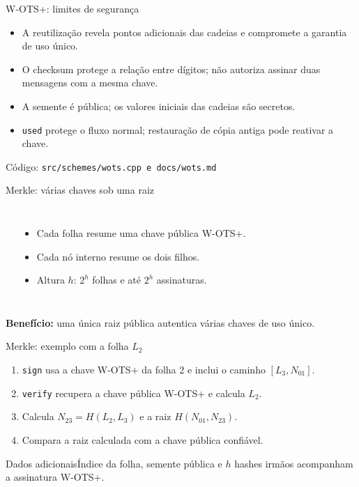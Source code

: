 \documentclass[aspectratio=169,11pt]{beamer}
\newcommand{\code}[1]{\texttt{#1}}
\newcommand{\src}[1]{\vfill{\scriptsize\color{muted} Código: \texttt{#1}}}
\begin{document}
\begin{frame}{W-OTS+: limites de segurança}
\begin{itemize}
\item A reutilização revela pontos adicionais das cadeias e compromete a garantia de uso único.
\item O checksum protege a relação entre dígitos; não autoriza assinar duas mensagens com a mesma chave.
\item A semente é pública; os valores iniciais das cadeias são secretos.
\item \code{used} protege o fluxo normal; restauração de cópia antiga pode reativar a chave.
\end{itemize}
\src{src/schemes/wots.cpp \quad e \quad docs/wots.md}
\end{frame}

\begin{frame}{Merkle: várias chaves sob uma raiz}
\begin{columns}[T,onlytextwidth]
\begin{center}\end{center}
\begin{itemize}
\item Cada folha resume uma chave pública W-OTS+.
\item Cada nó interno resume os dois filhos.
\item Altura $h$: $2^h$ folhas e até $2^h$ assinaturas.
\end{itemize}
\end{columns}
\vspace{0.25cm}\textbf{Benefício:} uma única raiz pública autentica várias chaves de uso único.
\end{frame}

\begin{frame}{Merkle: exemplo com a folha $L_2$}
\begin{enumerate}
\item \code{sign} usa a chave W-OTS+ da folha 2 e inclui o caminho $[L_3,N_{01}]$.
\item \code{verify} recupera a chave pública W-OTS+ e calcula $L_2$.
\item Calcula $N_{23}=H(L_2,L_3)$ e a raiz $H(N_{01},N_{23})$.
\item Compara a raiz calculada com a chave pública confiável.
\end{enumerate}
\vspace{0.15cm}
\begin{block}{Dados adicionais}Índice da folha, semente pública e $h$ hashes irmãos acompanham a assinatura W-OTS+.\end{block}
\end{frame}
\end{document}
